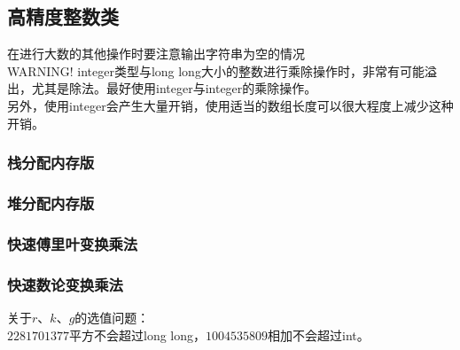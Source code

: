 \subsection{高精度整数类}

在进行大数的其他操作时要注意输出字符串为空的情况 \\
WARNING! integer类型与long long大小的整数进行乘除操作时，非常有可能溢出，尤其是除法。最好使用integer与integer的乘除操作。\\
另外，使用integer会产生大量开销，使用适当的数组长度可以很大程度上减少这种开销。\\

\subsubsection{栈分配内存版}


\subsubsection{堆分配内存版}


\subsubsection{快速傅里叶变换乘法}


\subsubsection{快速数论变换乘法}

关于$r$、$k$、$g$的选值问题：\\
$2281701377$平方不会超过long long，$1004535809$相加不会超过int。\\

